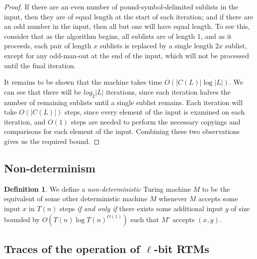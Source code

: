 \documentclass[english]{article}
\theoremstyle{plain}
\theoremstyle{definition}
\newtheorem{defn}[thm]{Definition}
\theoremstyle{plain}
\begin{document}
\begin{proof}
  If there are an even number of pound-symbol-delimited sublists in
  the input, then they are of equal length at the start of each
  iteration; and if there are an odd number in the input, then all but
  one will have equal length. To see this, consider that as the
  algorithm begins, all sublists are of length 1, and as it proceeds,
  each pair of length $x$ sublists is replaced by a single length $2x$
  sublist, except for any odd-man-out at the end of the input, which
  will not be processed until the final iteration.

  It remains to be shown that the machine takes time
  $O(|C(L)|\log|L|)$. We can see that there will be $log_2|L|$
  iterations, since each iteration halves the number of remaining
  sublists until a single sublist remains. Each iteration will take
  $O(|C(L)|)$ steps, since every element of the input is examined on
  each iteration, and $O(1)$ steps are needed to perform the necessary
  copyings and comparisons for each element of the input. Combining
  these two observations gives us the required bound.
\end{proof}


\subsection{Non-determinism}

\begin{defn}
  We define a \emph{non-deterministic} Turing machine $M$ to be the
  equivalent of some other deterministic machine $M$ whenever $M$
  accepts some input $x$ in $T(n)$ steps \emph{if and only if} there
  exists some additional input $y$ of size bounded by $O(T(n)\log
  T(n)^{O(1)})$ such that $M'$ accepts $(x,y)$.
\end{defn}

\subsection{Traces of the operation of $\ell$-bit RTMs}
\end{document}
